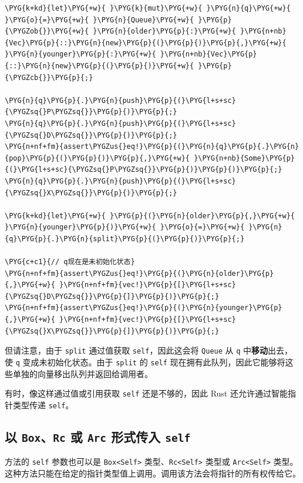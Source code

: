 \begin{Verbatim}[commandchars=\\\{\},breaklines=true,breakanywhere=true,fontsize=\codefont,xleftmargin=17bp]
\PYG{k+kd}{let}\PYG{+w}{ }\PYG{k}{mut}\PYG{+w}{ }\PYG{n}{q}\PYG{+w}{ }\PYG{o}{=}\PYG{+w}{ }\PYG{n}{Queue}\PYG{+w}{ }\PYG{p}{\PYGZob{}}\PYG{+w}{ }\PYG{n}{older}\PYG{p}{:}\PYG{+w}{ }\PYG{n+nb}{Vec}\PYG{p}{::}\PYG{n}{new}\PYG{p}{(}\PYG{p}{)}\PYG{p}{,}\PYG{+w}{ }\PYG{n}{younger}\PYG{p}{:}\PYG{+w}{ }\PYG{n+nb}{Vec}\PYG{p}{::}\PYG{n}{new}\PYG{p}{(}\PYG{p}{)}\PYG{+w}{ }\PYG{p}{\PYGZcb{}}\PYG{p}{;}

\PYG{n}{q}\PYG{p}{.}\PYG{n}{push}\PYG{p}{(}\PYG{l+s+sc}{\PYGZsq{}P\PYGZsq{}}\PYG{p}{)}\PYG{p}{;}
\PYG{n}{q}\PYG{p}{.}\PYG{n}{push}\PYG{p}{(}\PYG{l+s+sc}{\PYGZsq{}D\PYGZsq{}}\PYG{p}{)}\PYG{p}{;}
\PYG{n+nf+fm}{assert\PYGZus{}eq!}\PYG{p}{(}\PYG{n}{q}\PYG{p}{.}\PYG{n}{pop}\PYG{p}{(}\PYG{p}{)}\PYG{p}{,}\PYG{+w}{ }\PYG{n+nb}{Some}\PYG{p}{(}\PYG{l+s+sc}{\PYGZsq{}P\PYGZsq{}}\PYG{p}{)}\PYG{p}{)}\PYG{p}{;}
\PYG{n}{q}\PYG{p}{.}\PYG{n}{push}\PYG{p}{(}\PYG{l+s+sc}{\PYGZsq{}X\PYGZsq{}}\PYG{p}{)}\PYG{p}{;}

\PYG{k+kd}{let}\PYG{+w}{ }\PYG{p}{(}\PYG{n}{older}\PYG{p}{,}\PYG{+w}{ }\PYG{n}{younger}\PYG{p}{)}\PYG{+w}{ }\PYG{o}{=}\PYG{+w}{ }\PYG{n}{q}\PYG{p}{.}\PYG{n}{split}\PYG{p}{(}\PYG{p}{)}\PYG{p}{;}

\PYG{c+c1}{// q现在是未初始化状态}
\PYG{n+nf+fm}{assert\PYGZus{}eq!}\PYG{p}{(}\PYG{n}{older}\PYG{p}{,}\PYG{+w}{ }\PYG{n+nf+fm}{vec!}\PYG{p}{[}\PYG{l+s+sc}{\PYGZsq{}D\PYGZsq{}}\PYG{p}{]}\PYG{p}{)}\PYG{p}{;}
\PYG{n+nf+fm}{assert\PYGZus{}eq!}\PYG{p}{(}\PYG{n}{younger}\PYG{p}{,}\PYG{+w}{ }\PYG{n+nf+fm}{vec!}\PYG{p}{[}\PYG{l+s+sc}{\PYGZsq{}X\PYGZsq{}}\PYG{p}{]}\PYG{p}{)}\PYG{p}{;}
\end{Verbatim}

但请注意，由于 \texttt{split} 通过值获取 \texttt{self}，因此这会将 \texttt{Queue} 从 \texttt{q} 中\textbf{移动}出去，使 \texttt{q} 变成未初始化状态。由于 \texttt{split} 的 \texttt{self} 现在拥有此队列，因此它能够将这些单独的向量移出队列并返回给调用者。

有时，像这样通过值或引用获取 \texttt{self} 还是不够的，因此 Rust 还允许通过智能指针类型传递 \texttt{self}。

\subsection{以 \texttt{Box}、\texttt{Rc} 或 \texttt{Arc} 形式传入 \texttt{self}}

方法的 \texttt{self} 参数也可以是 \texttt{Box<Self>} 类型、\texttt{Rc<Self>} 类型或 \texttt{Arc<Self>} 类型。这种方法只能在给定的指针类型值上调用。调用该方法会将指针的所有权传给它。


